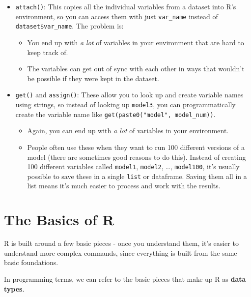 \documentclass[
]{book}
\providecommand{\tightlist}{%
  \setlength{\itemsep}{0pt}\setlength{\parskip}{0pt}}
\begin{document}
\begin{itemize}
\tightlist
\item
  \texttt{attach()}: This copies all the individual variables from a dataset
  into R's environment, so you can access them with just \texttt{var\_name}
  instead of \texttt{dataset\$var\_name}. The problem is:

  \begin{itemize}
  \tightlist
  \item
    You end up with \emph{a lot} of variables in your environment that are
    hard to keep track of.
  \item
    The variables can get out of sync with each other in ways
    that wouldn't be possible if they were kept in the dataset.
  \end{itemize}
\item
  \texttt{get()} and \texttt{assign()}: These allow you to look up and create variable
  names using strings, so instead of looking up \texttt{model3}, you can
  programmatically create the variable name like
  \texttt{get(paste0("model",\ model\_num))}.

  \begin{itemize}
  \tightlist
  \item
    Again, you can end up with \emph{a lot} of variables in your environment.
  \item
    People often use these when they want to run 100 different versions
    of a model (there are sometimes good reasons to do this). Instead of creating
    100 different variables called \texttt{model1}, \texttt{model2}, \ldots, \texttt{model100}, it's
    usually possible to save these in a single \texttt{list} or dataframe. Saving
    them all in a list means it's much easier to process and work
    with the results.
  \end{itemize}
\end{itemize}

\hypertarget{the-basics-of-r}{%
\chapter{The Basics of R}\label{the-basics-of-r}}

R is built around a few basic pieces - once you understand them,
it's easier to understand more complex commands, since everything
is built from the same basic foundations.

In programming terms, we can refer to the basic pieces that make
up R as \textbf{data types}.
\end{document}
